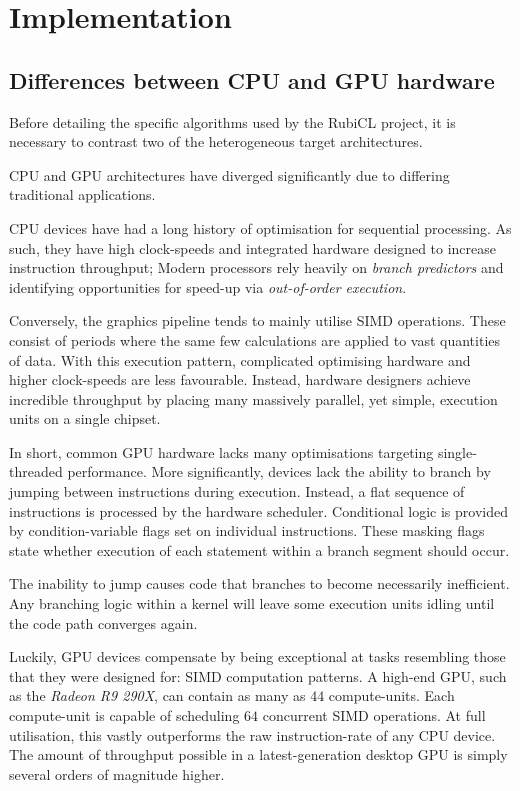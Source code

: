 \chapter{Implementation}
\section{Differences between CPU and GPU hardware}
Before detailing the specific algorithms  used by the RubiCL project, it is necessary to contrast two of the heterogeneous target architectures.

\ac{CPU} and \ac{GPU} architectures have diverged significantly due to differing traditional applications.

\ac{CPU} devices have had a long history of optimisation for sequential processing. As such, they have high clock-speeds and integrated hardware designed to increase instruction throughput; Modern processors rely heavily on \emph{branch predictors} and identifying opportunities for speed-up via \emph{out-of-order execution}.

Conversely, the graphics pipeline tends to mainly utilise \ac{SIMD} operations. These consist of periods where the same few calculations are applied to vast quantities of data. With this execution pattern, complicated optimising hardware and higher clock-speeds are less favourable. Instead, hardware designers achieve incredible throughput by placing many massively parallel, yet simple, execution units on a single chipset.

In short, common \ac{GPU} hardware lacks many optimisations targeting single-threaded performance. More significantly, devices lack the ability to branch by jumping between instructions during execution. Instead, a flat sequence of instructions is processed by the hardware scheduler. Conditional logic is provided by condition-variable flags set on individual instructions. These masking flags state whether execution of each statement within a branch segment should occur.

The inability to jump causes code that branches to become necessarily inefficient. Any branching logic within a kernel will leave some execution units idling until the code path converges again.

Luckily, \ac{GPU} devices compensate by being exceptional at tasks resembling those that they were designed for: \ac{SIMD} computation patterns. A high-end \ac{GPU}, such as the \emph{Radeon R9 290X}, can contain as many as $44$ compute-units. Each compute-unit is capable of scheduling $64$ concurrent \ac{SIMD} operations. At full utilisation, this vastly outperforms the raw instruction-rate of any \ac{CPU} device. The amount of throughput possible in a latest-generation desktop \ac{GPU} is simply several orders of magnitude higher.

